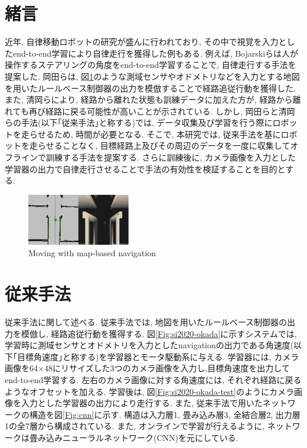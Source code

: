 \documentclass{ujarticle}
\begin{document}
\maketitle
\thispagestyle{empty}
\pagestyle{empty}

\small
\section{緒言}%
近年, 自律移動ロボットの研究が盛んに行われており, その中で視覚を入力としたend-to-end学習により自律走行を獲得した例もある. 例えば, Bojarskiら\cite{bojarski}は人が操作するステアリングの角度をend-to-end学習することで, 自律走行する手法を提案した. 岡田ら\cite{si2020-okada}\cite{si2021-okada}は, 図\ref{Fig:navigation}のような測域センサやオドメトリなどを入力とする地図を用いたルールベース制御器の出力を模倣することで経路追従行動を獲得した. また, 清岡ら\cite{si2021-kiyooka}により, 経路から離れた状態も訓練データに加えた方が, 経路から離れても再び経路に戻る可能性が高いことが示されている. しかし, 岡田らと清岡らの手法(以下｢従来手法｣と称する)では, データ収集及び学習を行う際にロボットを走らせるため, 時間が必要となる. そこで, 本研究では, 従来手法を基にロボットを走らせることなく, 目標経路上及びその周辺のデータを一度に収集してオフラインで訓練する手法を提案する. さらに訓練後に, カメラ画像を入力とした学習器の出力で自律走行させることで手法の有効性を検証することを目的とする.

\begin{figure}[h]
	\centering
	\includegraphics[width=0.4\textwidth]{img/navigation.png}
	\caption{Moving with map-based navigation}
	\label{Fig:navigation}
\end{figure}

\section{従来手法}%
従来手法に関して述べる. 従来手法では, 地図を用いたルールベース制御器の出力を模倣し, 経路追従行動を獲得する. 図\ref{Fig:si2020-okada}に示すシステムでは, 学習時に測域センサとオドメトリを入力としたnavigation\cite{navigation}の出力である角速度(以下｢目標角速度｣と称する)を学習器とモータ駆動系に与える. 学習器には, カメラ画像を64×48にリサイズした3つのカメラ画像を入力し,目標角速度を出力してend-to-end学習する. 左右のカメラ画像に対する角速度には, それぞれ経路に戻るようなオフセットを加える. 学習後は, 図\ref{Fig:si2020-okada-test}のようにカメラ画像を入力とした学習器の出力により走行する. また, 従来手法で用いたネットワークの構造を図\ref{Fig:cnn}に示す. 構造は入力層1, 畳み込み層3, 全結合層2, 出力層1の全7層から構成されている. また, オンラインで学習が行えるように, ネットワークは畳み込みニューラルネットワーク(CNN)を元にしている. 
\end{document}
